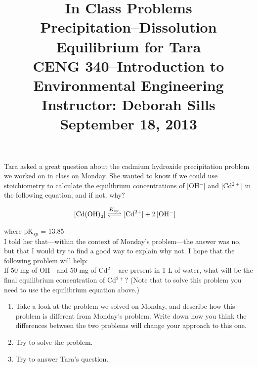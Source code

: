 \documentclass[12pt,letterpaper]{article}
\begin{document}
\setlength{\parindent}{0cm} 


\frenchspacing






\title {\large{In Class Problems} \\ 
{\large \textbf{Precipitation--Dissolution Equilibrium for Tara}\\CENG 340--Introduction to Environmental Engineering\\
Instructor: Deborah Sills\\September 18, 2013}}

\author{}

\date {}
\maketitle
\vspace{-0.5in}

Tara asked a great question about the cadmium hydroxide precipitation problem we worked on in class on Monday. She wanted to know if we could use stoichiometry to calculate the equilibrium concentrations of [OH$^-$] and [Cd$^{2+}$] in the following equation, and if not, why?

\begin{align*}
\cee{[Cd(OH)_2]  &<=>[K_{sp}] [Cd^{2+}] + 2[OH^-]}
\end{align*}

where pK$_{sp}$ = 13.85\\

I told her that---within the context of Monday's problem---the answer was no, but that I would try to find a good way to explain why not.  I hope that the following problem will help:\\

If 50 mg of OH$^-$ and 50 mg of Cd$^{2+}$ are present in 1 L of water, what will be the final equilibrium concentration of Cd$^{2+}$? (Note that to solve this problem you need to use the equilibrium equation above.)
\begin{enumerate}

\item Take a look at the problem we solved on Monday, and describe how this problem is different from Monday's problem.  Write down how you think the differences between the two problems will change your approach to this one.


\item Try to solve the problem.\



\item Try to answer Tara's question.








\end{enumerate}
\end{document}
